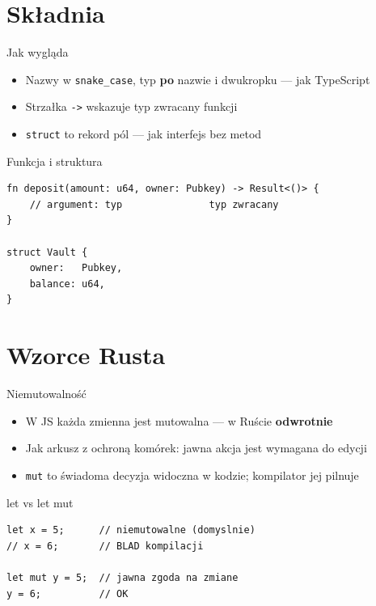 \section{Składnia}

\begin{frame}[fragile]{Jak wygląda}
  \begin{itemize}
    \item Nazwy w \texttt{snake\_case}, typ \textbf{po} nazwie i dwukropku --- jak TypeScript
    \item Strzałka \texttt{->} wskazuje typ zwracany funkcji
    \item \texttt{struct} to rekord pól --- jak interfejs bez metod
  \end{itemize}
  \begin{block}{Funkcja i struktura}
\begin{lstlisting}
fn deposit(amount: u64, owner: Pubkey) -> Result<()> {
    // argument: typ               typ zwracany
}

struct Vault {
    owner:   Pubkey,
    balance: u64,
}
\end{lstlisting}
  \end{block}
\end{frame}

\section{Wzorce Rusta}

\begin{frame}[fragile]{Niemutowalność}
  \begin{itemize}
    \item W JS każda zmienna jest mutowalna --- w Ruście \textbf{odwrotnie}
    \item Jak arkusz z ochroną komórek: jawna akcja jest wymagana do edycji
    \item \texttt{mut} to świadoma decyzja widoczna w kodzie; kompilator jej pilnuje
  \end{itemize}
  \begin{block}{let vs let mut}
\begin{lstlisting}
let x = 5;      // niemutowalne (domyslnie)
// x = 6;       // BLAD kompilacji

let mut y = 5;  // jawna zgoda na zmiane
y = 6;          // OK
\end{lstlisting}
  \end{block}
\end{frame}

